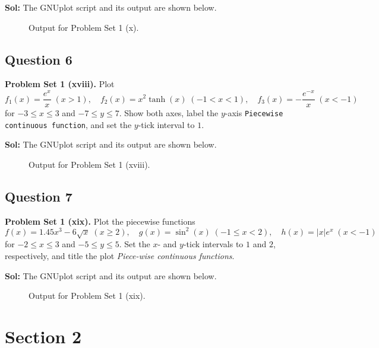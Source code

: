 \documentclass{book}
\begin{document}
\noindent\textbf{Sol:} The GNUplot script and its output are shown below.

\begin{figure}[H]
    \centering
    
    \caption{Output for Problem Set 1 (x).}
\end{figure}
\newpage

\subsection*{Question 6}
\noindent\textbf{Problem Set 1 (xviii).} Plot
\[
f_1(x)=\frac{e^x}{x}\;(x>1),\quad f_2(x)=x^2\tanh(x)\;(-1<x<1),\quad f_3(x)=-\frac{e^{-x}}{x}\;(x<-1)
\]
for $-3\le x\le3$ and $-7\le y\le7$. Show both axes, label the $y$-axis \texttt{Piecewise continuous function}, and set the $y$-tick interval to $1$.

\noindent\textbf{Sol:} The GNUplot script and its output are shown below.

\begin{figure}[H]
    \centering
    
    \caption{Output for Problem Set 1 (xviii).}
\end{figure}
\newpage

\subsection*{Question 7}
\noindent\textbf{Problem Set 1 (xix).} Plot the piecewise functions
\[
f(x)=1.45x^3-6\sqrt{x}\;(x\ge2),\quad g(x)=\sin^2(x)\;(-1\le x<2),\quad h(x)=|x|e^x\;(x<-1)
\]
for $-2\le x\le3$ and $-5\le y\le5$. Set the $x$- and $y$-tick intervals to $1$ and $2$, respectively, and title the plot \textit{Piece-wise continuous functions}.

\noindent\textbf{Sol:} The GNUplot script and its output are shown below.

\begin{figure}[H]
    \centering
    
    \caption{Output for Problem Set 1 (xix).}
\end{figure}
\newpage
\section*{Section 2}
\end{document}
